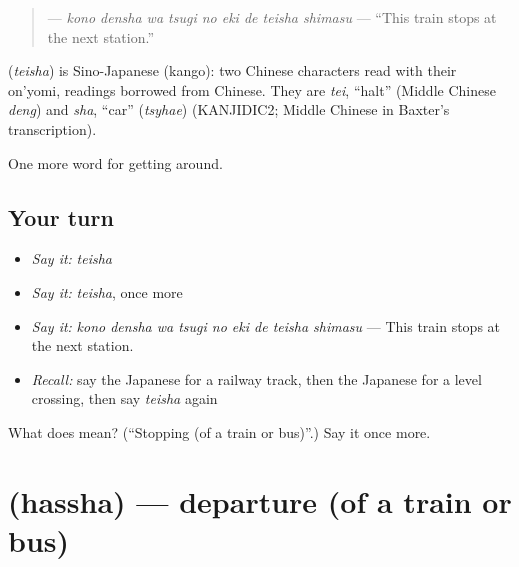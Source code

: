 \begin{quote}
\textbf{    } — \emph{kono densha wa tsugi no eki de teisha shimasu} — \textquotedblleft{}This train stops at the next station.\textquotedblright{}
\end{quote}

\begin{cousinweb}
\textbf{} (\emph{teisha}) is Sino-Japanese (kango): two Chinese characters read with their on'yomi, readings borrowed from Chinese. They are \emph{tei}, \textquotedblleft{}halt\textquotedblright{} (Middle Chinese \emph{deng}) and \emph{sha}, \textquotedblleft{}car\textquotedblright{} (\emph{tsyhae}) (KANJIDIC2; Middle Chinese in Baxter's transcription).
\end{cousinweb}

\begin{grammarlens}[title={What you've built}]
One more word for getting around.
\end{grammarlens}

\subsection*{Your turn}
\begin{itemize}
\raggedright
  \item \emph{Say it:} \emph{teisha}
  \item \emph{Say it:} \emph{teisha}, once more
  \item \emph{Say it:} \emph{kono densha wa tsugi no eki de teisha shimasu} — This train stops at the next station.
  \item \emph{Recall:} say the Japanese for a railway track, then the Japanese for a level crossing, then say \emph{teisha} again
\end{itemize}

\begin{tcolorbox}[breakable,colback=teal!4,colframe=teal!35!black,title={Before you move on}]
What does  mean? (\textquotedblleft{}Stopping (of a train or bus)\textquotedblright{}.) Say it once more.
\end{tcolorbox}
\section[\texorpdfstring{\ja{はっしゃ} (hassha)}{はっしゃ (hassha)}]{ (hassha) — departure (of a train or bus)}

\label{lesson:JA-C374-hassha}



